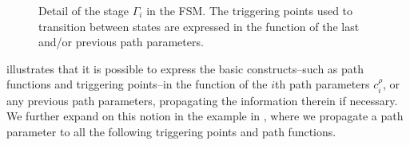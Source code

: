 \begin{figure}[h!]
  \center
  \caption[Detail of a stage in the FSM]{Detail of the stage $\Gamma_i$ in the FSM. The triggering points used to transition between states are expressed in the function of the last and/or previous path parameters.}
  \label{fig:state-machine2}
\end{figure}
 illustrates that it is possible to express the basic constructs--such as path functions and triggering points--in the function of the $i$th path parameters $c_{i}^{\rho}$, or any previous path parameters, propagating the information therein if necessary. We further expand on this notion in the example in , where we propagate a path parameter to all the following triggering points and path functions.

